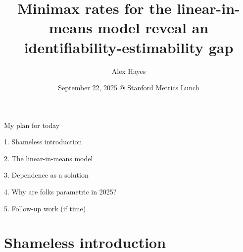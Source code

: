 \documentclass[aspectratio=169]{beamer}
\title{Minimax rates for the linear-in-means model reveal an identifiability-estimability gap}
\author{Alex Hayes}
\date{September 22, 2025 @ Stanford Metrics Lunch}
\institute{Joint work with Keith Levin at UW-Madison}
\theoremstyle{remark}
\begin{document}
\maketitle

\begin{frame}{My plan for today}
    
    \large
    
    1. Shameless introduction
    
    2. The linear-in-means model
    
    3. Dependence as a solution
    
    4. Why are folks parametric in 2025?
    
    5. Follow-up work (if time)
    
\end{frame}

\section{Shameless introduction}
\end{document}
